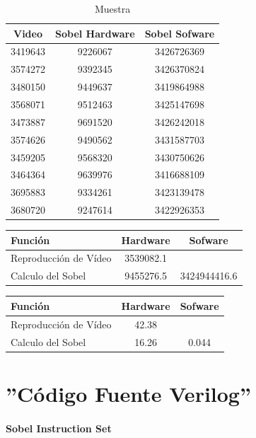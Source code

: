 \documentclass[a4paper,12pt,titlepage,final]{book}
\begin{document}
\begin{table}[hd]
\centering
\begin{tabular}{*{3}{c}}
Video   & Sobel Hardware & Sobel Sofware \\
\hline
3419643 &    9226067     &  3426726369   \\
3574272 &    9392345     &  3426370824   \\
3480150 &    9449637     &  3419864988   \\
3568071 &    9512463     &  3425147698   \\
3473887 &    9691520     &  3426242018   \\
3574626 &    9490562     &  3431587703   \\
3459205 &    9568320     &  3430750626   \\
3464364 &    9639976     &  3416688109   \\
3695883 &    9334261     &  3423139478   \\
3680720 &    9247614     &  3422926353   \\
\end{tabular}
\caption{Muestra}
\label{tab:Muestra}
\end{table}

\begin{tabular}{l c c}
Función               & Hardware & Sofware \\
\hline
Reproducción de Vídeo & 3539082.1  &       \\
Calculo del Sobel     & 9455276.5  & 3424944416.6       \\
\end{tabular}

\begin{tabular}{l c c}
Función               & Hardware & Sofware \\
\hline
Reproducción de Vídeo & 42.38  &       \\
Calculo del Sobel     & 16.26  & 0.044       \\
\end{tabular}

\appendix
\pagestyle{empty}
\appendixpage
\noappendicestocpagenum
\addappheadtotoc

\chapter{''Código Fuente Verilog''}
\subsubsection{Sobel Instruction Set}

\end{document}
